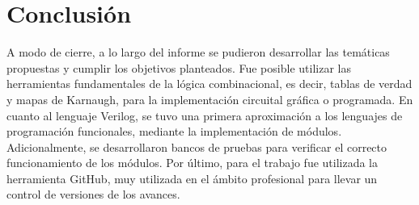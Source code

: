 \section{Conclusi\'on}
\noindent
A modo de cierre, a lo largo del informe se pudieron desarrollar las tem\'aticas propuestas y cumplir los objetivos planteados.
Fue posible utilizar las herramientas fundamentales de la l\'ogica combinacional, es decir, tablas de verdad y mapas de Karnaugh,
para la implementaci\'on circuital gr\'afica o programada. En cuanto al lenguaje Verilog, se tuvo una primera aproximaci\'on
a los lenguajes de programaci\'on funcionales, mediante la implementaci\'on de m\'odulos. Adicionalmente, se desarrollaron bancos de 
pruebas para verificar el correcto funcionamiento de los m\'odulos. 
Por \'ultimo, para el trabajo fue utilizada la herramienta GitHub, muy utilizada en el \'ambito profesional para llevar un control
de versiones de los avances. 

